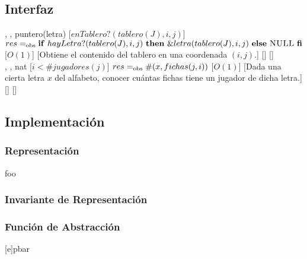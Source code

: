 \begin{interfaz}{\subsection{Interfaz}}
\begin{operaciones}
    \noindent{}
    {
      ,
      ,
    }{puntero(letra)}
    [$enTablero?(tablero(J),i,j)$]
    {$res\igobs\IFL{hayLetra?(tablero(J),i,j)}THEN{\&letra(tablero(J),i,j)}ELSE{\NULL}FI$}
    [$O(1)$]
    [Obtiene el contenido del tablero en una coordenada $(i,j)$.]
    [\falta]
    [\falta]\\

    \noindent{}
    {
      ,
      ,
    }{nat}
    [$i < \#jugadores(j)$]
    {$res=_{\mathrm{obs}} \#(x,fichas(j,i))$}
    [$O(1)$]
    [Dada una cierta letra $x$ del alfabeto, conocer cuántas fichas tiene un jugador de dicha letra.]
    [\falta]
    [\falta]\\

  \end{operaciones}
\end{interfaz}

\subsection{Implementación}
\subsubsection*{Representación}
\begin{Estructura}{foo}
\begin{Tupla}
\end{Tupla}
\end{Estructura}

\subsubsection*{Invariante de Representación}

\par\vspace*{3ex}%

\subsubsection*{Función de Abstracción}
[e]{p}{bar}

